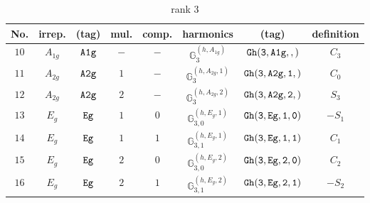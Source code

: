\documentclass[fleqn,8pt]{jsarticle}
\begin{document}
\begin{table}[ht!]
\begin{center}
\caption{rank 3}
\renewcommand{\arraystretch}{1.3}
\begin{tabular}{cccccccc} \hline \hline
No. & irrep. & (tag) & mul. & comp. & harmonics & (tag) & definition \\ \hline
$ 10 $ & $ A_{1g} $ & $ {\tt A1g} $ & $ - $ & $ - $ & $ \mathbb{G}_{3}^{(h,A_{1g})} $ & $ {\tt Gh(3,A1g,,)} $ & $ C_{3} $ \\
$ 11 $ & $ A_{2g} $ & $ {\tt A2g} $ & $ 1 $ & $ - $ & $ \mathbb{G}_{3}^{(h,A_{2g},1)} $ & $ {\tt Gh(3,A2g,1,)} $ & $ C_{0} $ \\
$ 12 $ & $ A_{2g} $ & $ {\tt A2g} $ & $ 2 $ & $ - $ & $ \mathbb{G}_{3}^{(h,A_{2g},2)} $ & $ {\tt Gh(3,A2g,2,)} $ & $ S_{3} $ \\
$ 13 $ & $ E_{g} $ & $ {\tt Eg} $ & $ 1 $ & $ 0 $ & $ \mathbb{G}_{3,0}^{(h,E_{g},1)} $ & $ {\tt Gh(3,Eg,1,0)} $ & $ - S_{1} $ \\
$ 14 $ & $ E_{g} $ & $ {\tt Eg} $ & $ 1 $ & $ 1 $ & $ \mathbb{G}_{3,1}^{(h,E_{g},1)} $ & $ {\tt Gh(3,Eg,1,1)} $ & $ C_{1} $ \\
$ 15 $ & $ E_{g} $ & $ {\tt Eg} $ & $ 2 $ & $ 0 $ & $ \mathbb{G}_{3,0}^{(h,E_{g},2)} $ & $ {\tt Gh(3,Eg,2,0)} $ & $ C_{2} $ \\
$ 16 $ & $ E_{g} $ & $ {\tt Eg} $ & $ 2 $ & $ 1 $ & $ \mathbb{G}_{3,1}^{(h,E_{g},2)} $ & $ {\tt Gh(3,Eg,2,1)} $ & $ - S_{2} $ \\
 \hline \hline
\end{tabular}
\end{center}
\end{table}
\end{document}
